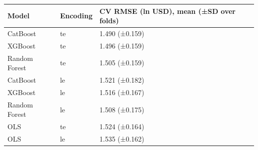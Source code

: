 \begin{tabular}{lll}
\toprule
Model & Encoding & CV RMSE (ln USD), mean (±SD over folds) \\
\midrule
CatBoost & te & 1.490 (±0.159) \\
XGBoost & te & 1.496 (±0.159) \\
Random Forest & te & 1.505 (±0.159) \\
CatBoost & le & 1.521 (±0.182) \\
XGBoost & le & 1.516 (±0.167) \\
Random Forest & le & 1.508 (±0.175) \\
OLS & te & 1.524 (±0.164) \\
OLS & le & 1.535 (±0.162) \\
\bottomrule
\end{tabular}
